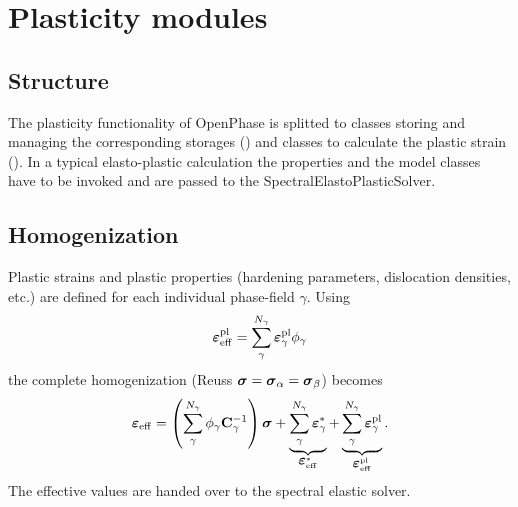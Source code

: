 \section{Plasticity modules}
\label{sec:module_plasticity}
\subsection*{Structure}
The plasticity functionality of OpenPhase is splitted to classes storing and managing the corresponding storages () and classes to calculate the plastic strain (). In a typical elasto-plastic calculation the properties and the model classes have to be invoked and are passed to the SpectralElastoPlasticSolver. 
\subsection*{Homogenization}
Plastic strains and plastic properties (hardening parameters, dislocation densities, etc.) are defined for each individual phase-field $\gamma$. Using
\begin{equation}
	\mbox{\boldmath $\varepsilon$}^{\mathrm{pl}}_{\mathrm{eff}} =\sum_\gamma^{N_\gamma} \mbox{\boldmath $\varepsilon$}^{\mathrm{pl}}_\gamma \phi_\gamma
\end{equation}
the complete homogenization (Reuss $\mbox{\boldmath $\sigma$} = \mbox{\boldmath $\sigma$}_\alpha = \mbox{\boldmath $\sigma$}_\beta$) becomes
\begin{equation}
  \mbox{\boldmath $\varepsilon$}_{\mathrm{eff}} = \left(\sum_\gamma^{N_\gamma}\phi_\gamma\mathcal{\mathbf{C}}_{\gamma}^{-1}\right)\mbox{\boldmath $\sigma$} +\underbrace{\sum_\gamma^{N_\gamma} \mbox{\boldmath $\varepsilon$}^*_\gamma}_{\mbox{\boldmath $\varepsilon$}^*_\mathrm{eff}} + \underbrace{\sum_\gamma^{N_\gamma} \mbox{\boldmath $\varepsilon$}^{\mathrm{pl}}_\gamma}_{\mbox{\boldmath $\varepsilon$}^\mathrm{pl}_{\mathrm{eff}}}.
\end{equation}
The effective values are handed over to the spectral elastic solver.
